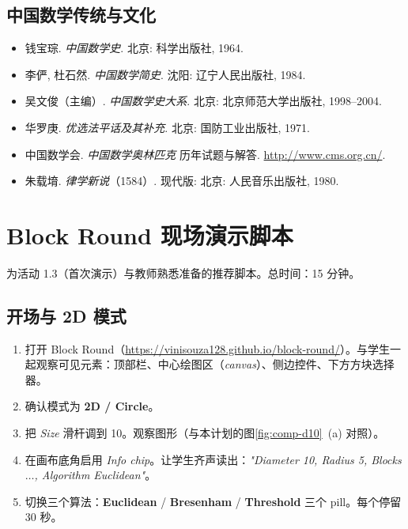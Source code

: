 \documentclass[12pt,a4paper]{scrartcl}
\newcommand{\acc}[1]{\textcolor{accent}{\textbf{#1}}}
\begin{document}
\subsection{中国数学传统与文化}
\begin{itemize}[leftmargin=1.3em,itemsep=0.15em,topsep=0.3em]
  \item 钱宝琮. \emph{中国数学史}. 北京: 科学出版社, 1964.
  \item 李俨, 杜石然. \emph{中国数学简史}. 沈阳: 辽宁人民出版社, 1984.
  \item 吴文俊（主编）. \emph{中国数学史大系}. 北京: 北京师范大学出版社, 1998--2004.
  \item 华罗庚. \emph{优选法平话及其补充}. 北京: 国防工业出版社, 1971.
  \item 中国数学会. \emph{中国数学奥林匹克} 历年试题与解答. \url{http://www.cms.org.cn/}.
  \item 朱载堉. \emph{律学新说}（1584）. 现代版: 北京: 人民音乐出版社, 1980.
\end{itemize}

\newpage
\appendix
\renewcommand{\thesection}{\Alph{section}}
\setcounter{section}{0}

\section{Block Round 现场演示脚本}\label{ap:roteiro}

为活动 1.3（首次演示）与教师熟悉准备的推荐脚本。总时间：15 分钟。

\subsection{开场与 2D 模式}
\begin{enumerate}[leftmargin=1.5em,itemsep=0.15em,topsep=0.3em]
  \item 打开 Block Round（\url{https://vinisouza128.github.io/block-round/}）。与学生一起观察可见元素：顶部栏、中心绘图区（\emph{canvas}）、侧边控件、下方方块选择器。
  \item 确认模式为 \acc{2D / Circle}。
  \item 把 \emph{Size} 滑杆调到 10。观察图形（与本计划的图\ref{fig:comp-d10}~(a) 对照）。
  \item 在画布底角启用 \emph{Info chip}。让学生齐声读出：\emph{"Diameter 10, Radius 5, Blocks $\dots$, Algorithm Euclidean"}。
  \item 切换三个算法：\acc{Euclidean} / \acc{Bresenham} / \acc{Threshold} 三个 pill。每个停留 30 秒。
\end{enumerate}
\end{document}
